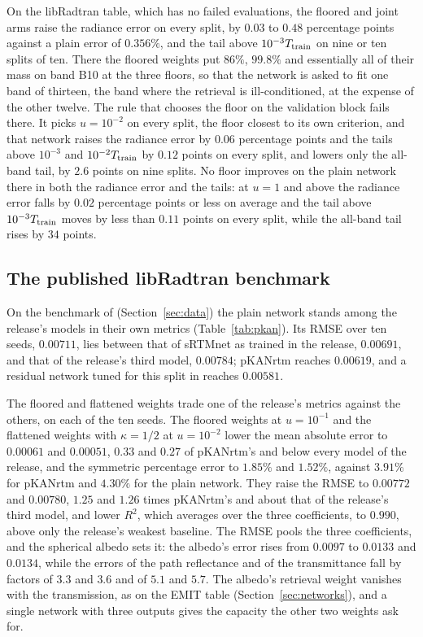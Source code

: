 \documentclass[11pt]{article}
\theoremstyle{remark}
\newcommand{\1}{\mathbf{1}}
\begin{document}
On the libRadtran table, which has no failed evaluations, the floored and joint arms raise the radiance error on every
split, by $0.03$ to $0.48$ percentage points against a plain error of $0.356\%$, and the tail above $10^{-3}T_{\rm
train}$ on nine or ten splits of ten. There the floored weights put $86\%$, $99.8\%$ and essentially all of their mass
on band B10 at the three floors, so that the network is asked to fit one band of thirteen, the band where the
retrieval is ill-conditioned, at the expense of the other twelve. The rule that chooses the floor on the validation
block fails there. It picks $u=10^{-2}$ on every split, the floor closest to its own criterion, and that network raises
the radiance error by $0.06$ percentage points and the tails above $10^{-3}$ and $10^{-2}T_{\rm train}$ by $0.12$
points on every split, and lowers only the all-band tail, by $2.6$ points on nine splits. No floor improves on the
plain network there in both the radiance error and the tails: at $u=1$ and above the radiance error falls by $0.02$ percentage points or less on
average and the tail above $10^{-3}T_{\rm train}$ moves by less than $0.11$ points on every split, while the all-band
tail rises by $34$ points.

\subsection{The published libRadtran benchmark}\label{sec:pkan}

On the benchmark of \cite{pkan} (Section~\ref{sec:data}) the plain network stands among the release's models in their
own metrics (Table~\ref{tab:pkan}). Its RMSE over ten seeds, $0.00711$, lies between that of sRTMnet \cite{brodrick} as
trained in the release, $0.00691$, and that of the release's third model, $0.00784$; pKANrtm reaches $0.00619$, and a
residual network tuned for this split in \cite{shmalo2} reaches $0.00581$.

The floored and flattened weights trade one of the release's metrics against the others, on each of the ten seeds. The
floored weights at $u=10^{-1}$ and the flattened weights with $\kappa=1/2$ at $u=10^{-2}$ lower the mean absolute error
to $0.00061$ and $0.00051$, $0.33$ and $0.27$ of pKANrtm's and below every model of the release, and the symmetric
percentage error to $1.85\%$ and $1.52\%$, against $3.91\%$ for pKANrtm and $4.30\%$ for the plain network. They raise
the RMSE to $0.00772$ and $0.00780$, $1.25$ and $1.26$ times pKANrtm's and about that of the release's third model, and
lower $R^2$, which averages over the three coefficients, to $0.990$, above only the release's weakest baseline. The RMSE
pools the three coefficients, and the spherical albedo sets it: the albedo's error rises from $0.0097$ to $0.0133$ and $0.0134$, while the errors of the path
reflectance and of the transmittance fall by factors of $3.3$ and $3.6$ and of $5.1$ and $5.7$. The albedo's retrieval
weight vanishes with the transmission, as on the EMIT table (Section~\ref{sec:networks}), and a single network with
three outputs gives the capacity the other two weights ask for.
\end{document}
